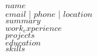 \documentclass{article}
\begin{document}
$name$\\
$email$ | $phone$ | $location$\\
$summary$\\
$work_experience$\\
$projects$\\
$education$\\
$skills$
\end{document}
